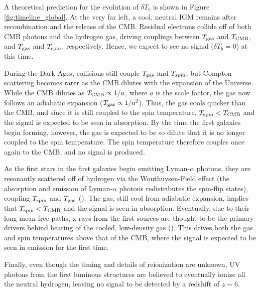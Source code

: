 A theoretical prediction for the evolution of $\delta T_{b}$ is shown in Figure \ref{fig:timeline_global}. At the very far left, a cool, neutral IGM remains after recombination and the release of the CMB. Residual electrons collide off of both CMB photons and the hydrogen gas, driving couplings between $T_{\rm gas}$ and $T_{\rm CMB}$, and $T_{\rm gas}$ and $T_{\rm spin}$, respectively. Hence, we expect to see no signal ($\delta T_{b} = 0$) at this time.

During the Dark Ages, collisions still couple $T_{\rm gas}$ and $T_{\rm spin}$, but Compton scattering becomes rarer as the CMB dilutes with the expansion of the Universe. While the CMB dilutes as $T_{\rm CMB} \propto 1/a$, where $a$ is the scale factor, the gas now follows an adiabatic expansion ($T_{\rm gas} \propto 1/a^{2}$). Thus, the gas cools quicker than the CMB, and since it is still coupled to the spin temperature, $T_{\rm spin} < T_{\rm CMB}$ and the signal is expected to be seen in absorption. By the time the first galaxies begin forming, however, the gas is expected to be so dilute that it is no longer coupled to the spin temperature. The spin temperature therefore couples once again to the CMB, and no signal is produced.

As the first stars in the first galaxies begin emitting Lyman-$\alpha$ photons, they are resonantly scattered off of hydrogen via the Wouthuysen-Field effect (the absorption and emission of Lyman-$\alpha$ photons redistributes the spin-flip states), coupling $T_{\rm spin}$ and $T_{\rm gas}$ (\citealt{pritchard_and_loeb2010}). The gas, still cool from adiabatic expansion, implies that $T_{\rm spin} < T_{\rm CMB}$ and the signal is seen in absorption. Eventually, due to their long mean free paths, x-rays from the first sources are thought to be the primary drivers behind heating of the cooled, low-density gas (\citealt{furlanetto_et_al2006}). This drives both the gas and spin temperatures above that of the CMB, where the signal is expected to be seen in emission for the first time. 

Finally, even though the timing and details of reionization are unknown, UV photons from the first luminous structures are believed to eventually ionize all the neutral hydrogen, leaving no signal to be detected by a redshift of $z \sim 6$. 

